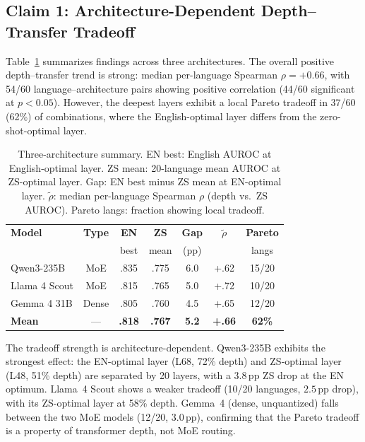 \documentclass[11pt,a4paper]{article}
\newcommand{\pp}{\,\text{pp}}
\begin{document}
\subsection{Claim 1: Architecture-Dependent Depth--Transfer Tradeoff}
\label{sec:pareto}

Table~\ref{tab:arch_summary} summarizes findings across three architectures.
The overall positive depth--transfer trend is strong: median per-language Spearman $\rho = +0.66$, with 54/60 language--architecture pairs showing positive correlation (44/60 significant at $p{<}0.05$).
However, the deepest layers exhibit a local Pareto tradeoff in 37/60 (62\%) of combinations, where the English-optimal layer differs from the zero-shot-optimal layer.

\begin{table}[t]
\centering
\small
\begin{tabular}{@{}lcccccc@{}}
\toprule
\textbf{Model} & \textbf{Type} & \textbf{EN} & \textbf{ZS} & \textbf{Gap} & \textbf{$\tilde{\rho}$} & \textbf{Pareto} \\
 & & best & mean & (pp) & & langs \\
\midrule
Qwen3-235B & MoE & .835 & .775 & 6.0 & +.62 & 15/20 \\
Llama 4 Scout & MoE & .815 & .765 & 5.0 & +.72 & 10/20 \\
Gemma 4 31B & Dense & .805 & .760 & 4.5 & +.65 & 12/20 \\
\midrule
\textbf{Mean} & --- & \textbf{.818} & \textbf{.767} & \textbf{5.2} & \textbf{+.66} & \textbf{62\%} \\
\bottomrule
\end{tabular}
\caption{Three-architecture summary. EN best: English AUROC at English-optimal layer. ZS mean: 20-language mean AUROC at ZS-optimal layer. Gap: EN best minus ZS mean at EN-optimal layer. $\tilde{\rho}$: median per-language Spearman $\rho$ (depth vs.\ ZS AUROC). Pareto langs: fraction showing local tradeoff.}
\label{tab:arch_summary}
\end{table}

The tradeoff strength is architecture-dependent.
Qwen3-235B exhibits the strongest effect: the EN-optimal layer (L68, 72\% depth) and ZS-optimal layer (L48, 51\% depth) are separated by 20 layers, with a $3.8\pp$ ZS drop at the EN optimum.
Llama~4 Scout shows a weaker tradeoff (10/20 languages, $2.5\pp$ drop), with its ZS-optimal layer at 58\% depth.
Gemma~4 (dense, unquantized) falls between the two MoE models (12/20, $3.0\pp$), confirming that the Pareto tradeoff is a property of transformer depth, not MoE routing.
\end{document}
